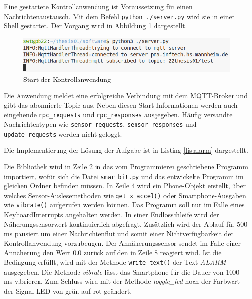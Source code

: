 \documentclass[11pt,a4paper]{report}
\begin{document}
Eine gestartete Kontrollanwendung ist Voraussetzung für einen Nachrichtenaustausch.
Mit dem Befehl \texttt{python ./server.py} wird sie in einer Shell gestartet.
Der Vorgang wird in Abbildung \ref{fig:start_controll_app} dargestellt.
\begin{figure}[htbp]
  \centering
  \includegraphics[width=.8\textwidth]{images/server_logging}
  \caption{Start der Kontrollanwendung}
  \label{fig:start_controll_app}
\end{figure}
Die Anwendung meldet eine erfolgreiche Verbindung mit dem MQTT-Broker und gibt das abonnierte Topic aus.
Neben diesen Start-Informationen werden auch eingehende \texttt{rpc\_requests} und \texttt{rpc\_responses} ausgegeben.
Häufig versandte Nachrichtentypen wie \texttt{sensor\_re\-quests}, \texttt{sensor\_responses} und \texttt{update\_requests} werden nicht geloggt.

Die Implementierung der Lösung der Aufgabe ist in Listing \ref{lis:alarm} dargestellt.
\lstset{language=python, captionpos=b, frame=single, numberstyle=\tiny, style=customcs}

Die Bibliothek wird in Zeile 2 in das vom Programmierer geschriebene Programm importiert, wofür sich die Datei \texttt{smartbit.py} und das entwickelte Programm im gleichen Ordner befinden müssen.
In Zeile 4 wird ein Phone-Objekt erstellt, über welches Sensor-Auslesemethoden wie \texttt{get\_x\_accel()} oder Smartphone-Ausgaben wie \texttt{vibrate()} aufgerufen werden können.
Das Programm soll nur im Falle eines KeyboardInterrupts angehalten werden.
In einer Endlosschleife wird der Näherungssensorwert kontinuierlich abgefragt.
Zusätzlich wird der Ablauf für 500 ms pausiert um einer Nachrichtenflut und somit einer Nichtverfügbarkeit der Kontrollanwendung vorzubeugen.
Der Annäherungssensor sendet im Falle einer Annäherung den Wert 0.0 zurück auf den in Zeile 8 reagiert wird.
Ist die Bedingung erfüllt, wird mit der Methode \texttt{write\_text()} der Text \textit{ALARM} ausgegeben.
Die Methode \textit{vibrate} lässt das Smartphone für die Dauer von 1000 ms vibrieren.
Zum Schluss wird mit der Methode \textit{toggle\_led} noch der Farbwert der Signal-LED von grün auf rot geändert.
\end{document}

